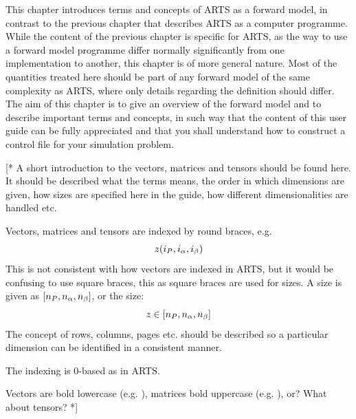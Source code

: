 This chapter introduces terms and concepts of ARTS as a forward model,
in contrast to the previous chapter that describes ARTS as a computer
programme. While the content of the previous chapter is specific for
ARTS, as the way to use a forward model programme differ normally
significantly from one implementation to another, this chapter is of
more general nature. Most of the quantities treated here should be
part of any forward model of the same complexity as ARTS, where only
details regarding the definition should differ. The aim of this
chapter is to give an overview of the forward model and to describe
important terms and concepts, in such way that the content of this user
guide can be fully appreciated and that you shall understand how to
construct a control file for your simulation problem.



\label{sec:fm_defs:math}

[* A short introduction to the vectors, matrices and tensors should be
found here. It should be described what the terms means, the order in
which dimensions are given, how sizes are specified here in the guide,
how different dimensionalities are handled etc. 

Vectors, matrices and tensors are indexed by round braces, e.g.
\begin{equation}
  z(i_{P},i_{\alpha},i_{\beta})
\end{equation}
This is not consistent with how vectors are indexed in ARTS, but it
would be confusing to use square braces, this as square braces are
used for sizes. A size is given as $
[n_{P},n_{\alpha},n_{\beta}]$, or the size:
\begin{equation}
  z \in [n_{P},n_{\alpha},n_{\beta}]
\end{equation}
The concept of rows, columns, pages etc. should be described so a
particular dimension can be identified in a consistent manner.

The indexing is 0-based as in ARTS. 

Vectors are bold lowercase (e.g. \MsrVct), matrices bold uppercase
(e.g. \SnsMtr), or? What about tensors? *]



\label{sec:fm_defs:atmosphere}


